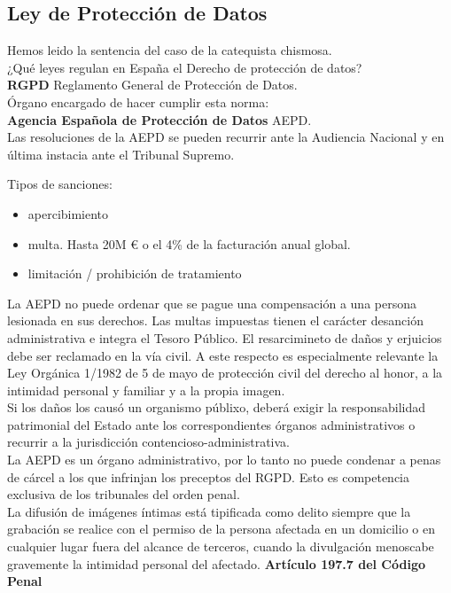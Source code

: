\documentclass[spanish, 12pt, a4paper, twoside]{article}
\begin{document}
\subsection{Ley de Protección de Datos}


Hemos leido la sentencia del caso de la catequista chismosa.\\

¿Qué leyes regulan en España el Derecho de protección de datos?\\
\textbf{RGPD} Reglamento General de Protección de Datos.\\

Órgano encargado de hacer cumplir esta norma:\\
\textbf{Agencia Española de Protección de Datos} AEPD.\\

Las resoluciones de la AEPD se pueden recurrir ante la Audiencia Nacional y en última instacia 
ante el Tribunal Supremo.

\hfill\break
Tipos de sanciones:
\begin{itemize}
    \item apercibimiento
    \item multa. Hasta 20M € o el 4\% de la facturación anual global.
    \item limitación / prohibición de tratamiento
\end{itemize}


La AEPD no puede ordenar que se pague una compensación a una persona lesionada en sus derechos. Las multas
impuestas tienen el carácter desanción administrativa e integra el Tesoro Público.
El resarcimineto de daños y erjuicios debe ser reclamado en la vía civil. A este respecto es especialmente relevante la 
Ley Orgánica 1/1982 de 5 de mayo de protección civil del derecho al honor, a la intimidad personal y familiar y a la propia imagen.\\

Si los daños los causó un organismo públixo, deberá exigir la responsabilidad patrimonial del Estado ante los correspondientes órganos
administrativos o recurrir a la jurisdicción contencioso-administrativa.\\


La AEPD es un órgano administrativo, por lo tanto no puede condenar a penas de cárcel a los que infrinjan los preceptos del RGPD.
Esto es competencia exclusiva de los tribunales del orden penal.\\


La difusión de imágenes íntimas está tipificada como delito siempre que la grabación se realice con el permiso 
de la persona afectada en un domicilio o en cualquier lugar fuera del alcance de terceros, cuando la divulgación menoscabe gravemente la intimidad personal del afectado. \textbf{Artículo 197.7 del Código Penal}\\
\end{document}
